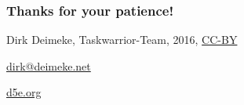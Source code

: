 \documentclass[t]{beamer}
\begin{document}
\begin{frame}[fragile]\frametitle{Thanks for your patience!}
    \vfill
    \begin{center}
        Dirk Deimeke, Taskwarrior-Team, 2016, \href{https://creativecommons.org/licenses/by/4.0/}{CC-BY}

        \href{mailto:dirk@deimeke.net}{dirk@deimeke.net}

        \href{https://d5e.org/}{d5e.org}
    \end{center}
\end{frame}
\end{document}
